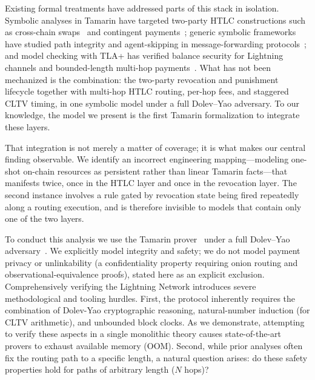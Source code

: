 \documentclass[sigconf,review]{acmart}
\theoremstyle{acmdefinition}
\begin{document}
Existing formal treatments have addressed parts of this stack in isolation. Symbolic analyses in Tamarin have targeted two-party HTLC constructions such as cross-chain swaps~\cite{boyd2020blockchain} and contingent payments~\cite{bursuc2019contingent}; generic symbolic frameworks have studied path integrity and agent-skipping in message-forwarding protocols~\cite{smith2022modelling}; and model checking with TLA+ has verified balance security for Lightning channels and bounded-length multi-hop payments~\cite{grundmann2025model}. What has not been mechanized is the combination: the two-party revocation and punishment lifecycle together with multi-hop HTLC routing, per-hop fees, and staggered CLTV timing, in one symbolic model under a full Dolev--Yao adversary. To our knowledge, the model we present is the first Tamarin formalization to integrate these layers.

That integration is not merely a matter of coverage; it is what makes our central finding observable. We identify an incorrect engineering mapping---modeling one-shot on-chain resources as persistent rather than linear Tamarin facts---that manifests twice, once in the HTLC layer and once in the revocation layer. The second instance involves a rule gated by revocation state being fired repeatedly along a routing execution, and is therefore invisible to models that contain only one of the two layers.

To conduct this analysis we use the Tamarin prover~\cite{meier2013tamarin} under a full Dolev--Yao adversary~\cite{dolev1983security}. We explicitly model integrity and safety; we do not model payment privacy or unlinkability (a confidentiality property requiring onion routing and observational-equivalence proofs), stated here as an explicit exclusion. Comprehensively verifying the Lightning Network introduces severe methodological and tooling hurdles. First, the protocol inherently requires the combination of Dolev-Yao cryptographic reasoning, natural-number induction (for CLTV arithmetic), and unbounded block clocks. As we demonstrate, attempting to verify these aspects in a single monolithic theory causes state-of-the-art provers to exhaust available memory (OOM). Second, while prior analyses often fix the routing path to a specific length, a natural question arises: do these safety properties hold for paths of arbitrary length ($N$ hops)?
\end{document}

